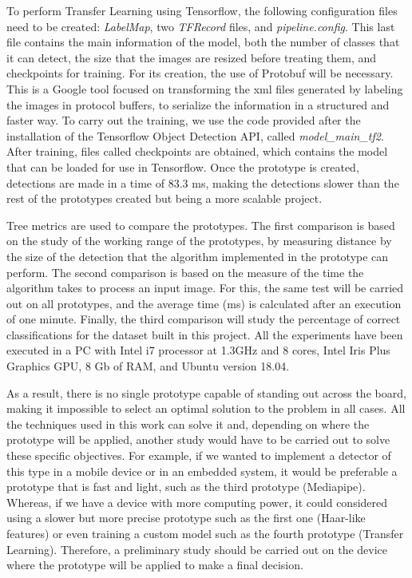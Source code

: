 \vspace{-0.3cm}
To perform Transfer Learning using Tensorflow, the following configuration files need to be created: \textit{LabelMap}, two \textit{TFRecord} files, and \textit{pipeline.config}. This last file contains the main information of the model, both the number of classes that it can detect, the size that the images are resized before treating them, and checkpoints for training. For its creation, the use of Protobuf will be necessary. This is a Google tool focused on transforming the xml files generated by labeling the images in protocol buffers, to serialize the information in a structured and faster way. To carry out the training, we use the code provided after the installation of the Tensorflow Object Detection API, called \textit{model\_main\_tf2}. After training, files called checkpoints are obtained, which contains the model that can be loaded for use in Tensorflow. Once the prototype is created, detections are made in a time of 83.3 ms, making the detections slower than the rest of the prototypes created but being a more scalable project.

\vspace{-0.3cm}
Tree metrics are used to compare the prototypes. The first comparison is based on the study of the working range of the prototypes, by measuring distance by the size of the detection that the algorithm implemented in the prototype can perform. The second comparison is based on the measure of the time the algorithm takes to process an input image. For this, the same test will be carried out on all prototypes, and the average time (ms) is calculated after an execution of one minute. Finally, the third comparison will study the percentage of correct classifications for the dataset built in this project. All the experiments have been executed in a PC with Intel i7 processor at 1.3GHz and 8 cores, Intel Iris Plus Graphics GPU, 8 Gb of RAM, and Ubuntu version 18.04.

\vspace{-0.3cm}
As a result, there is no single prototype capable of standing out across the board, making it impossible to select an optimal solution to the problem in all cases. All the techniques used in this work can solve it and, depending on where the prototype will be applied, another study would have to be carried out to solve these specific objectives. For example, if we wanted to implement a detector of this type in a mobile device or in an embedded system, it would be preferable a prototype that is fast and light, such as the third prototype (Mediapipe). Whereas, if we have a device with more computing power, it could considered using a slower but more precise prototype such as the first one (Haar-like features) or even training a custom model such as the fourth prototype (Transfer Learning). Therefore, a preliminary study should be carried out on the device where the prototype will be applied to make a final decision.


